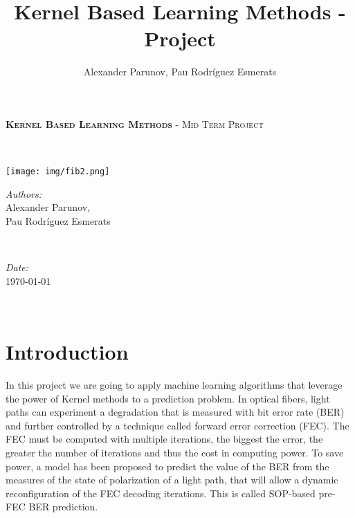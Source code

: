 \documentclass[a4paper]{article}
\title{Kernel Based Learning Methods - Project}
\author{Alexander Parunov, Pau Rodríguez Esmerats }
\begin{document}
%



\begin{minipage}{0.6\textwidth}
\begin{flushleft} \large
\textsc{\textbf{\Large Kernel Based Learning Methods }} - \textsc{\large Mid Term Project }\\[0.5cm] %
\end{flushleft}
\end{minipage}
~
\begin{minipage}{0.4\textwidth}
\begin{flushright} \large
\texttt{[image: img/fib2.png]}\\[0.3cm]
\end{flushright}
\end{minipage}
 


\begin{minipage}{0.7\textwidth}
\begin{flushleft} 
\emph{Authors:}\\
Alexander Parunov, \\ Pau Rodríguez Esmerats
\end{flushleft}
\end{minipage}
~
\begin{minipage}{0.3\textwidth}
\begin{flushleft}
\emph{Date:}\\
\today
\end{flushleft}
\end{minipage}\\[0.5cm]


\section{Introduction}

In this project we are going to apply machine learning algorithms that leverage the power of Kernel methods to a prediction problem. In optical fibers, light paths can experiment a degradation that is measured with bit error rate (BER) and further controlled by a technique called forward error correction (FEC). The FEC must be computed with multiple iterations, the biggest the error, the greater the number of iterations and thus the cost in computing power. To save power, a model has been proposed to predict the value of the BER from the measures of the state of polarization of a light path, that will allow a dynamic reconfiguration of the FEC decoding iterations. This is called SOP-based pre-FEC BER prediction. 
\end{document}
